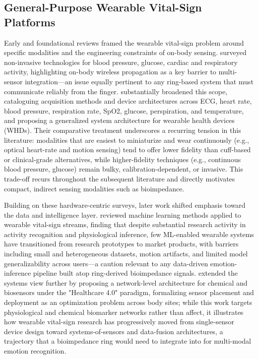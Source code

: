 \subsection{General-Purpose Wearable Vital-Sign Platforms}
Early and foundational reviews framed the wearable vital-sign problem around specific modalities and the engineering constraints of on-body sensing. \cite{yilmaz2010detecting} surveyed non-invasive technologies for blood pressure, glucose, cardiac and respiratory activity, highlighting on-body wireless propagation as a key barrier to multi-sensor integration---an issue equally pertinent to any ring-based system that must communicate reliably from the finger. \cite{dias2018wearable} substantially broadened this scope, cataloguing acquisition methods and device architectures across ECG, heart rate, blood pressure, respiration rate, SpO2, glucose, perspiration, and temperature, and proposing a generalized system architecture for wearable health devices (WHDs). Their comparative treatment underscores a recurring tension in this literature: modalities that are easiest to miniaturize and wear continuously (e.g., optical heart-rate and motion sensing) tend to offer lower fidelity than cuff-based or clinical-grade alternatives, while higher-fidelity techniques (e.g., continuous blood pressure, glucose) remain bulky, calibration-dependent, or invasive. This trade-off recurs throughout the subsequent literature and directly motivates compact, indirect sensing modalities such as bioimpedance.

Building on these hardware-centric surveys, later work shifted emphasis toward the data and intelligence layer. \cite{sabry2022machine} reviewed machine learning methods applied to wearable vital-sign streams, finding that despite substantial research activity in activity recognition and physiological inference, few ML-enabled wearable systems have transitioned from research prototypes to market products, with barriers including small and heterogeneous datasets, motion artifacts, and limited model generalizability across users---a caution relevant to any data-driven emotion-inference pipeline built atop ring-derived bioimpedance signals. \cite{he2023smart} extended the systems view further by proposing a network-level architecture for chemical and biosensors under the "Healthcare 4.0" paradigm, formalizing sensor placement and deployment as an optimization problem across body sites; while this work targets physiological and chemical biomarker networks rather than affect, it illustrates how wearable vital-sign research has progressively moved from single-sensor device design toward systems-of-sensors and data-fusion architectures, a trajectory that a bioimpedance ring would need to integrate into for multi-modal emotion recognition.


